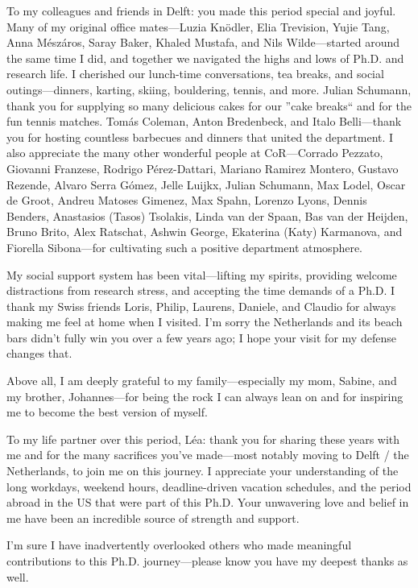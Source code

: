 To my colleagues and friends in Delft: you made this period special and joyful. Many of my original office mates—Luzia Knödler, Elia Trevision, Yujie Tang, Anna Mészáros, Saray Baker, Khaled Mustafa, and Nils Wilde—started around the same time I did, and together we navigated the highs and lows of Ph.D. and research life. I cherished our lunch-time conversations, tea breaks, and social outings—dinners, karting, skiing, bouldering, tennis, and more. Julian Schumann, thank you for supplying so many delicious cakes for our ''cake breaks`` and for the fun tennis matches.
Tomás Coleman, Anton Bredenbeck, and Italo Belli—thank you for hosting countless barbecues and dinners that united the department. I also appreciate the many other wonderful people at CoR—Corrado Pezzato, Giovanni Franzese, Rodrigo Pérez-Dattari, Mariano Ramirez Montero, Gustavo Rezende, Alvaro Serra Gómez, Jelle Luijkx, Julian Schumann, Max Lodel, Oscar de Groot, Andreu Matoses Gimenez, Max Spahn, Lorenzo Lyons, Dennis Benders, Anastasios (Tasos) Tsolakis, Linda van der Spaan, Bas van der Heijden, Bruno Brito, Alex Ratschat, Ashwin George, Ekaterina (Katy) Karmanova, and Fiorella Sibona—for cultivating such a positive department atmosphere.

My social support system has been vital—lifting my spirits, providing welcome distractions from research stress, and accepting the time demands of a Ph.D. I thank my Swiss friends Loris, Philip, Laurens, Daniele, and Claudio for always making me feel at home when I visited. I’m sorry the Netherlands and its beach bars didn’t fully win you over a few years ago; I hope your visit for my defense changes that.

Above all, I am deeply grateful to my family—especially my mom, Sabine, and my brother, Johannes—for being the rock I can always lean on and for inspiring me to become the best version of myself.

To my life partner over this period, Léa: thank you for sharing these years with me and for the many sacrifices you’ve made—most notably moving to Delft / the Netherlands, to join me on this journey. I appreciate your understanding of the long workdays, weekend hours, deadline-driven vacation schedules, and the period abroad in the US that were part of this Ph.D. Your unwavering love and belief in me have been an incredible source of strength and support.

I’m sure I have inadvertently overlooked others who made meaningful contributions to this Ph.D. journey—please know you have my deepest thanks as well.


